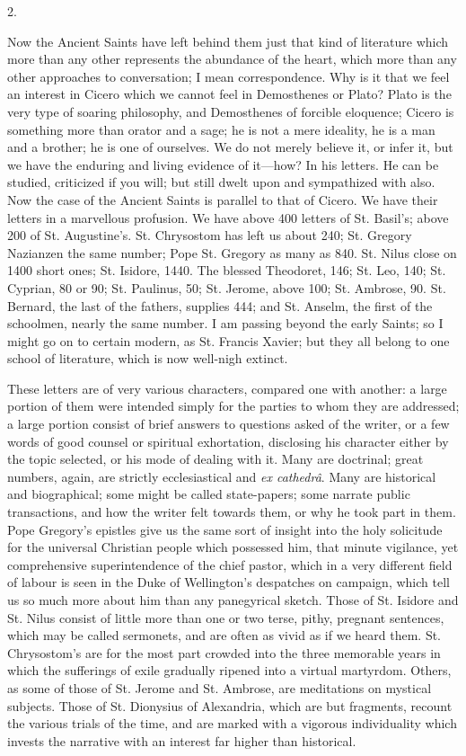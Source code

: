 2.

Now the Ancient Saints have left behind them just that kind of
literature which more than any other represents the abundance of the
heart, which more than any other approaches to conversation; I mean
correspondence. Why is it that we feel an interest in Cicero which we
cannot feel in Demosthenes or Plato? Plato is the very type of soaring
philosophy, and Demosthenes of forcible eloquence; Cicero is something
more than orator and a sage; he is not a mere ideality, he is a man
and a brother; he is one of ourselves. We do not merely believe it, or
infer it, but we have the enduring and living evidence of it—how? In
his letters. He can be studied, criticized if you will; but still
dwelt upon and sympathized with also. Now the case of the Ancient
Saints is parallel to that of Cicero. We have their letters in a
marvellous profusion. We have above 400 letters of St. Basil's; above
200 of St. Augustine's. St. Chrysostom has left us about 240; St.
Gregory Nazianzen the same number; Pope St. Gregory as many as 840.
St. Nilus close on 1400 short ones; St. Isidore, 1440. The
blessed Theodoret, 146; St. Leo, 140; St. Cyprian, 80 or 90; St.
Paulinus, 50; St. Jerome, above 100; St. Ambrose, 90. St. Bernard, the
last of the fathers, supplies 444; and St. Anselm, the first of the
schoolmen, nearly the same number. I am passing beyond the early
Saints; so I might go on to certain modern, as St. Francis Xavier; but
they all belong to one school of literature, which is now well-nigh
extinct.

These letters are of very various characters, compared one with
another: a large portion of them were intended simply for the parties
to whom they are addressed; a large portion consist of brief answers
to questions asked of the writer, or a few words of good counsel or
spiritual exhortation, disclosing his character either by the topic
selected, or his mode of dealing with it. Many are doctrinal; great
numbers, again, are strictly ecclesiastical and \emph{ex cathedrâ}.
Many are historical and biographical; some might be called
state-papers; some narrate public transactions, and how the writer
felt towards them, or why he took part in them. Pope Gregory's
epistles give us the same sort of insight into the holy solicitude for
the universal Christian people which possessed him, that minute
vigilance, yet comprehensive superintendence of the chief pastor,
which in a very different field of labour is seen in the Duke of
Wellington's despatches on campaign, which tell us so much more about
him than any panegyrical sketch. Those of St. Isidore and St. Nilus
consist of little more than one or two terse, pithy, pregnant
sentences, which may be called sermonets, and are often as vivid as if
we heard them. St. Chrysostom's are for the most part crowded into the
three memorable years in which the sufferings of exile gradually
ripened into a virtual martyrdom. Others, as some of those of St.
Jerome and St. Ambrose, are meditations on mystical subjects.
Those of St. Dionysius of Alexandria, which are but fragments, recount
the various trials of the time, and are marked with a vigorous
individuality which invests the narrative with an interest far higher
than historical.


